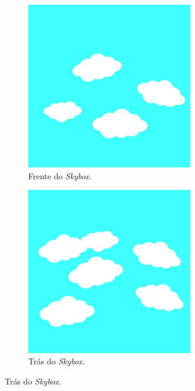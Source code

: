 \begin{figure}[H]
    \centering
    \begin{subfigure}[t]{0.3\textwidth}
        \centering
        \includegraphics[width=0.8\textwidth]{figuras/front.jpg}
        \caption{Frente do \textit{Skybox}.}
    \end{subfigure}
    \hfill
    \begin{subfigure}[t]{0.3\textwidth}
        \centering
        \includegraphics[width=0.8\textwidth]{figuras/back.jpg}
        \caption{Trás do \textit{Skybox}.}
    \end{subfigure}
    \hfill

\end{figure}
